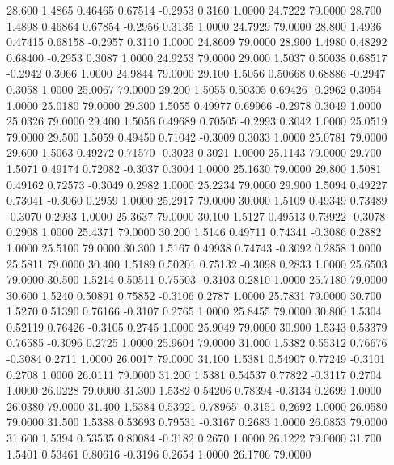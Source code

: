   28.600   1.4865   0.46465   0.67514  -0.2953   0.3160   1.0000  24.7222  79.0000
  28.700   1.4898   0.46864   0.67854  -0.2956   0.3135   1.0000  24.7929  79.0000
  28.800   1.4936   0.47415   0.68158  -0.2957   0.3110   1.0000  24.8609  79.0000
  28.900   1.4980   0.48292   0.68400  -0.2953   0.3087   1.0000  24.9253  79.0000
  29.000   1.5037   0.50038   0.68517  -0.2942   0.3066   1.0000  24.9844  79.0000
  29.100   1.5056   0.50668   0.68886  -0.2947   0.3058   1.0000  25.0067  79.0000
  29.200   1.5055   0.50305   0.69426  -0.2962   0.3054   1.0000  25.0180  79.0000
  29.300   1.5055   0.49977   0.69966  -0.2978   0.3049   1.0000  25.0326  79.0000
  29.400   1.5056   0.49689   0.70505  -0.2993   0.3042   1.0000  25.0519  79.0000
  29.500   1.5059   0.49450   0.71042  -0.3009   0.3033   1.0000  25.0781  79.0000
  29.600   1.5063   0.49272   0.71570  -0.3023   0.3021   1.0000  25.1143  79.0000
  29.700   1.5071   0.49174   0.72082  -0.3037   0.3004   1.0000  25.1630  79.0000
  29.800   1.5081   0.49162   0.72573  -0.3049   0.2982   1.0000  25.2234  79.0000
  29.900   1.5094   0.49227   0.73041  -0.3060   0.2959   1.0000  25.2917  79.0000
  30.000   1.5109   0.49349   0.73489  -0.3070   0.2933   1.0000  25.3637  79.0000
  30.100   1.5127   0.49513   0.73922  -0.3078   0.2908   1.0000  25.4371  79.0000
  30.200   1.5146   0.49711   0.74341  -0.3086   0.2882   1.0000  25.5100  79.0000
  30.300   1.5167   0.49938   0.74743  -0.3092   0.2858   1.0000  25.5811  79.0000
  30.400   1.5189   0.50201   0.75132  -0.3098   0.2833   1.0000  25.6503  79.0000
  30.500   1.5214   0.50511   0.75503  -0.3103   0.2810   1.0000  25.7180  79.0000
  30.600   1.5240   0.50891   0.75852  -0.3106   0.2787   1.0000  25.7831  79.0000
  30.700   1.5270   0.51390   0.76166  -0.3107   0.2765   1.0000  25.8455  79.0000
  30.800   1.5304   0.52119   0.76426  -0.3105   0.2745   1.0000  25.9049  79.0000
  30.900   1.5343   0.53379   0.76585  -0.3096   0.2725   1.0000  25.9604  79.0000
  31.000   1.5382   0.55312   0.76676  -0.3084   0.2711   1.0000  26.0017  79.0000
  31.100   1.5381   0.54907   0.77249  -0.3101   0.2708   1.0000  26.0111  79.0000
  31.200   1.5381   0.54537   0.77822  -0.3117   0.2704   1.0000  26.0228  79.0000
  31.300   1.5382   0.54206   0.78394  -0.3134   0.2699   1.0000  26.0380  79.0000
  31.400   1.5384   0.53921   0.78965  -0.3151   0.2692   1.0000  26.0580  79.0000
  31.500   1.5388   0.53693   0.79531  -0.3167   0.2683   1.0000  26.0853  79.0000
  31.600   1.5394   0.53535   0.80084  -0.3182   0.2670   1.0000  26.1222  79.0000
  31.700   1.5401   0.53461   0.80616  -0.3196   0.2654   1.0000  26.1706  79.0000
